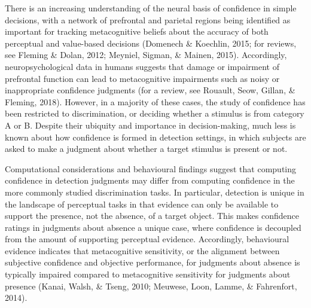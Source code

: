 \documentclass[12pt,twoside]{reedthesis}
\begin{document}
There is an increasing understanding of the neural basis of confidence in simple decisions, with a network of prefrontal and parietal regions being identified as important for tracking metacognitive beliefs about the accuracy of both perceptual and value-based decisions (Domenech \& Koechlin, 2015; for reviews, see Fleming \& Dolan, 2012; Meyniel, Sigman, \& Mainen, 2015). Accordingly, neuropsychological data in humans suggests that damage or impairment of prefrontal function can lead to metacognitive impairments such as noisy or inappropriate confidence judgments (for a review, see Rouault, Seow, Gillan, \& Fleming, 2018). However, in a majority of these cases, the study of confidence has been restricted to discrimination, or deciding whether a stimulus is from category A or B. Despite their ubiquity and importance in decision-making, much less is known about how confidence is formed in detection settings, in which subjects are asked to make a judgment about whether a target stimulus is present or not.

Computational considerations and behavioural findings suggest that computing confidence in detection judgments may differ from computing confidence in the more commonly studied discrimination tasks. In particular, detection is unique in the landscape of perceptual tasks in that evidence can only be available to support the presence, not the absence, of a target object. This makes confidence ratings in judgments about absence a unique case, where confidence is decoupled from the amount of supporting perceptual evidence. Accordingly, behavioural evidence indicates that metacognitive sensitivity, or the alignment between subjective confidence and objective performance, for judgments about absence is typically impaired compared to metacognitive sensitivity for judgments about presence (Kanai, Walsh, \& Tseng, 2010; Meuwese, Loon, Lamme, \& Fahrenfort, 2014).
\end{document}
